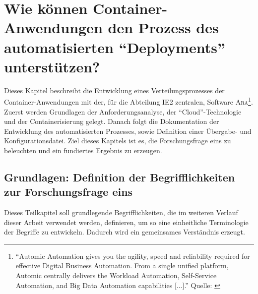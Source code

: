 \chapter[Forschungsfrage 1]{Wie können Container-Anwendungen den Prozess des automatisierten \enquote{Deployments} unterstützen?} \label{ff1}
Dieses Kapitel beschreibt die Entwicklung eines Verteilungsprozesses der Container-Anwendungen mit der, für die Abteilung \ac{IE2} zentralen, Software \textsc{Ara}\footnote{\enquote{Automic Automation gives you the agility, speed and reliability required for effective Digital Business Automation. From a single unified platform, Automic centrally delivers the Workload Automation, Self-Service Automation, and Big Data Automation capabilities [...].} Quelle: \cite{broadcom_inc_automic_2020}}. Zuerst werden Grundlagen der Anforderungsanalyse, der \enquote{Cloud}-Technologie und der Containerisierung gelegt. Danach folgt die Dokumentation der Entwicklung des automatisierten Prozesses, sowie Definition einer Übergabe- und Konfigurationsdatei. Ziel dieses Kapitels ist es, die Forschungsfrage eins zu beleuchten und ein fundiertes Ergebnis zu erzeugen.

\section{Grundlagen: Definition der Begrifflichkeiten zur Forschungsfrage eins}
Dieses Teilkapitel soll grundlegende Begrifflichkeiten, die im weiteren Verlauf dieser Arbeit verwendet werden, definieren, um so eine einheitliche Terminologie der Begriffe zu entwickeln. Dadurch wird ein gemeinsames Verständnis erzeugt.

